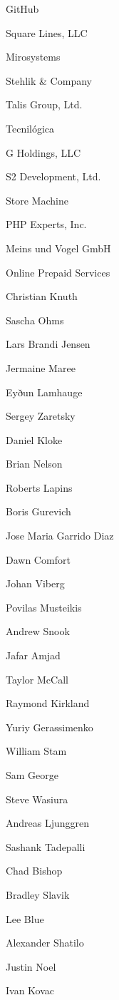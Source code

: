 \begin{DoxyItemize}
\item Git\+Hub
\item Square Lines, L\+LC
\item Mirosystems
\item Stehlik \& Company
\item Talis Group, Ltd.
\item Tecnilógica
\item G Holdings, L\+LC
\item S2 Development, Ltd.
\item Store Machine
\item P\+HP Experts, Inc.
\item Meins und Vogel GmbH
\item Online Prepaid Services
\item Christian Knuth
\item Sascha Ohms
\item Lars Brandi Jensen
\item Jermaine Maree
\item Eyðun Lamhauge
\item Sergey Zaretsky
\item Daniel Kloke
\item Brian Nelson
\item Roberts Lapins
\item Boris Gurevich
\item Jose Maria Garrido Diaz
\item Dawn Comfort
\item Johan Viberg
\item Povilas Musteikis
\item Andrew Snook
\item Jafar Amjad
\item Taylor Mc\+Call
\item Raymond Kirkland
\item Yuriy Gerassimenko
\item William Stam
\item Sam George
\item Steve Wasiura
\item Andreas Ljunggren
\item Sashank Tadepalli
\item Chad Bishop
\item Bradley Slavik
\item Lee Blue
\item Alexander Shatilo
\item Justin Noel
\item Ivan Kovac

\end{DoxyItemize}
